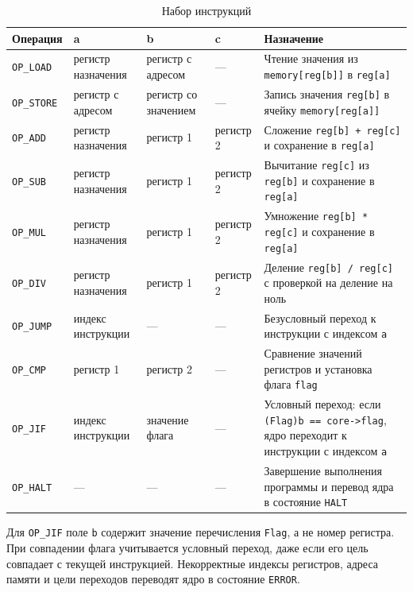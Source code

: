 \documentclass[12pt,a4paper]{article}
\begin{document}
\begin{table}[H]
    \centering
    \caption{Набор инструкций}
    \label{tab:instructions}
    \begin{tabular}{|p{2.1cm}|p{2.2cm}|p{2.2cm}|p{2.2cm}|p{4.1cm}|}
        \hline
        \textbf{Операция} & \textbf{a} & \textbf{b} & \textbf{c} & \textbf{Назначение} \\
        \hline
        \texttt{OP\_LOAD} & регистр назначения & регистр с адресом & --- & Чтение значения из \texttt{memory[reg[b]]} в \texttt{reg[a]} \\
        \hline
        \texttt{OP\_STORE} & регистр с адресом & регистр со значением & --- & Запись значения \texttt{reg[b]} в ячейку \texttt{memory[reg[a]]} \\
        \hline
        \texttt{OP\_ADD} & регистр назначения & регистр 1 & регистр 2 & Сложение \texttt{reg[b] + reg[c]} и сохранение в \texttt{reg[a]} \\
        \hline
        \texttt{OP\_SUB} & регистр назначения & регистр 1 & регистр 2 & Вычитание \texttt{reg[c]} из \texttt{reg[b]} и сохранение в \texttt{reg[a]} \\
        \hline
        \texttt{OP\_MUL} & регистр назначения & регистр 1 & регистр 2 & Умножение \texttt{reg[b] * reg[c]} и сохранение в \texttt{reg[a]} \\
        \hline
        \texttt{OP\_DIV} & регистр назначения & регистр 1 & регистр 2 & Деление \texttt{reg[b] / reg[c]} с проверкой на деление на ноль \\
        \hline
        \texttt{OP\_JUMP} & индекс инструкции & --- & --- & Безусловный переход к инструкции с индексом \texttt{a} \\
        \hline
        \texttt{OP\_CMP} & регистр 1 & регистр 2 & --- & Сравнение значений регистров и установка флага \texttt{flag} \\
        \hline
        \texttt{OP\_JIF} & индекс инструкции & значение флага & --- & Условный переход: если \texttt{(Flag)b == core->flag}, ядро переходит к инструкции с индексом \texttt{a} \\
        \hline
        \texttt{OP\_HALT} & --- & --- & --- & Завершение выполнения программы и перевод ядра в состояние \texttt{HALT} \\
        \hline
    \end{tabular}
\end{table}

Для \texttt{OP\_JIF} поле \texttt{b} содержит значение перечисления \texttt{Flag}, а не номер регистра. При совпадении флага учитывается условный переход, даже если его цель совпадает с текущей инструкцией. Некорректные индексы регистров, адреса памяти и цели переходов переводят ядро в состояние \texttt{ERROR}.
\end{document}
